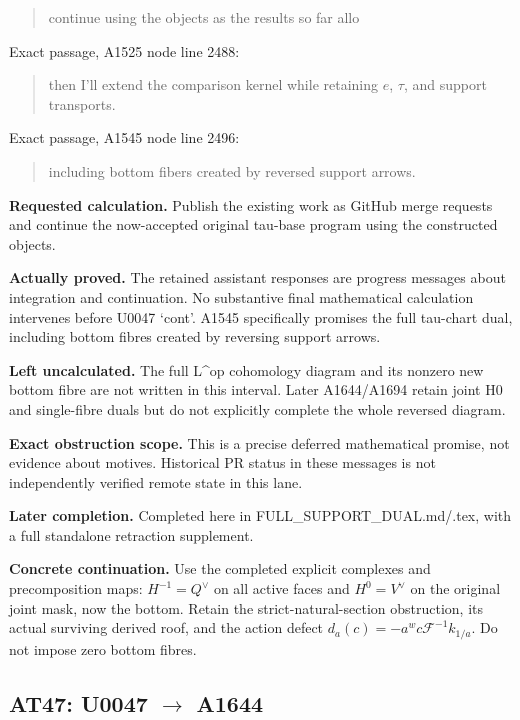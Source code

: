 \begin{quote}
continue using the objects as the results so far allo
\end{quote}

Exact passage, A1525 node
\protect{} line 2488:

\begin{quote}
then I'll extend the comparison kernel while retaining \(e\), \(\tau\),
and support transports.
\end{quote}

Exact passage, A1545 node
\protect{} line 2496:

\begin{quote}
including bottom fibers created by reversed support arrows.
\end{quote}

\textbf{Requested calculation.} Publish the existing work as GitHub
merge requests and continue the now-accepted original tau-base program
using the constructed objects.

\textbf{Actually proved.} The retained assistant responses are progress
messages about integration and continuation. No substantive final
mathematical calculation intervenes before U0047 `cont'. A1545
specifically promises the full tau-chart dual, including bottom fibres
created by reversing support arrows.

\textbf{Left uncalculated.} The full L\^{}op cohomology diagram and its
nonzero new bottom fibre are not written in this interval. Later
A1644/A1694 retain joint H0 and single-fibre duals but do not explicitly
complete the whole reversed diagram.

\textbf{Exact obstruction scope.} This is a precise deferred
mathematical promise, not evidence about motives. Historical PR status
in these messages is not independently verified remote state in this
lane.

\textbf{Later completion.} Completed here in
FULL\_SUPPORT\_DUAL.md/.tex, with a full standalone retraction
supplement.

\textbf{Concrete continuation.} Use the completed explicit complexes and
precomposition maps: \(H^{-1}=Q^\vee\) on all active faces and
\(H^0=V^\vee\) on the original joint mask, now the bottom. Retain the
strict-natural-section obstruction, its actual surviving derived roof,
and the action defect \(d_a(c)=-a^w c\mathcal F^{-1}k_{1/a}\). Do not
impose zero bottom fibres.

\subsection{\texorpdfstring{AT47: U0047
\allowbreak{}\ensuremath{→}\allowbreak{}
A1644}{AT47: U0047  A1644}}\label{TranscriptLedgerStage:at47-u0047-a1644}

